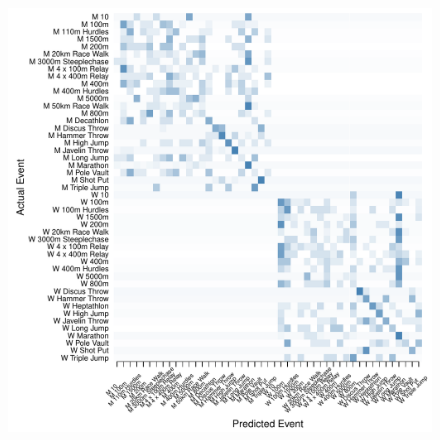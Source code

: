 \begin{figure}
\begin{center}
\begin{minipage}{0.20\textwidth}
\begin{center}
    \end{center}
  \end{minipage}
  \hspace{0.05\textwidth}
  \begin{minipage}{0.20\textwidth}
    \begin{center}
      \includegraphics[scale=0.20]{../graphics/athletesRF-tst.pdf}
    \end{center}
  \end{minipage}




\end{center}
\end{figure}
